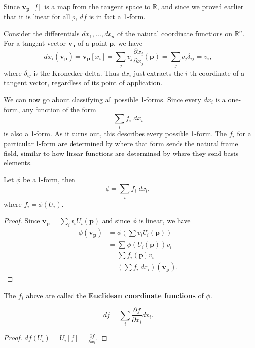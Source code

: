 \documentclass[10pt]{report}
\begin{document}
Since $\mathbf{v}_{\mathbf{p}}[f]$ is a map from the tangent space to $\mathbb{R}$, and since we proved earlier that it is linear for all $p$, $df$ is in fact a 1-form.

\begin{ex}
Consider the differentials $dx_1, \dots, dx_n$ of the natural coordinate functions on $\mathbb{R}^n$. For a tangent vector $\mathbf{v}_{\mathbf{p}}$ of a point $\mathbf{p}$, we have
\[
	dx_i(\mathbf{v}_{\mathbf{p}}) = \mathbf{v}_{\mathbf{p}}[x_i] = \sum_j v_j \frac{\partial x_i}{\partial x_j} (\mathbf{p}) = \sum_j v_j \delta_{ij} = v_i,
\] where $\delta_{ij}$ is the Kronecker delta. Thus $dx_i$ just extracts the $i$-th coordinate of a tangent vector, regardless of its point of application.
\end{ex}

We can now go about classifying all possible 1-forms. Since every $dx_i$ is a one-form, any function of the form
\[
\sum_i f_i \;dx_i
\] is also a 1-form. As it turns out, this describes every possible 1-form. The $f_i$ for a particular 1-form are determined by where that form sends the natural frame field, similar to how linear functions are determined by where they send basis elements.

\begin{prop}
Let $\phi$ be a 1-form, then
\[
	\phi = \sum_i f_i \;dx_i,
\] where $f_i = \phi(U_i)$.
\end{prop}
\begin{proof}
	Since $\mathbf{v}_{\mathbf{p}} = \sum_i v_i U_i(\mathbf{p})$ and since $\phi$ is linear, we have
	\begin{align*}
		\phi(\mathbf{v}_{\mathbf{p}}) &= \phi\left( \sum v_i U_i(\mathbf{p}) \right) \\
					      &= \sum \phi(U_i(\mathbf{p}))v_i \\
					      &= \sum f_i(\mathbf{p}) v_i \\
					      &= \left( \sum f_i \;dx_i \right)(\mathbf{v}_{\mathbf{p}}).
	\end{align*}
\end{proof}

\begin{defn}
The $f_i$ above are called the \textbf{Euclidean coordinate functions} of $\phi$.
\end{defn}

\begin{cor}
	\[ df = \sum_i \frac{\partial f}{\partial x_i} dx_i.\]
\end{cor}
\begin{proof}
	$df(U_i) = U_i[f] = \frac{\partial f}{\partial x_i} .$
\end{proof}
\end{document}
